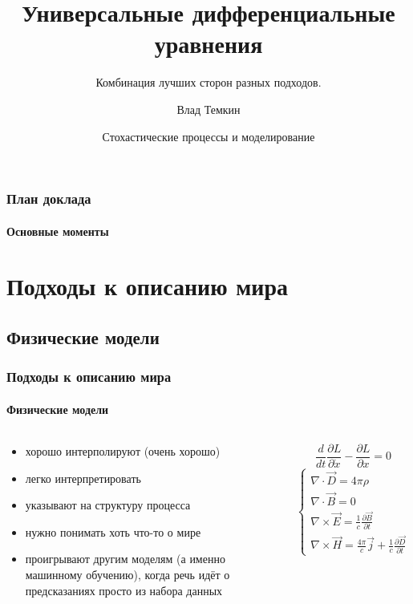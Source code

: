 \documentclass[10pt,pdf,hyperref={unicode}]{beamer}
\title[UDE]{Универсальные дифференциальные уравнения}
\subtitle{Комбинация лучших сторон разных подходов.}
\author{Влад Темкин}
\institute[HSE] %
{
	Высшая Школа Экономики\\
	Факультет Физики
}
\date[\today]
{Стохастические процессы и моделирование}
\begin{document}
	
	\begin{frame}
		\titlepage
	\end{frame} 
	
	
	\begin{frame}
		\frametitle{План доклада} 
		\framesubtitle{Основные моменты}
		\tableofcontents[pausesections]
	\end{frame}


	\section{Подходы к описанию мира}
	
		\subsection{Физические модели}
		
			\begin{frame}
				\frametitle{Подходы к описанию мира} 
				\framesubtitle{Физические модели}
					\begin{columns}
						\column{0.5\linewidth}
						\begin{center}
							\begin{itemize}
								\item хорошо интерполируют (очень хорошо)
								\item легко интерпретировать 
								\item указывают на структуру процесса
								\item нужно понимать хоть что-то о мире
								\item проигрывают другим моделям (а именно машинному обучению), когда речь идёт о предсказаниях просто из набора данных
							\end{itemize}
						\end{center}
						\column{0.5\linewidth}
							\begin{displaymath}
								\frac{d}{dt}\frac{\partial L}{\partial \dot{x}} - \frac{\partial L}{\partial x} = 0
							\end{displaymath}
							\newline
							\begin{displaymath}
								\left\{\begin{gathered}
									\nabla \cdot \vec{D} = 4\pi	\rho\\
									\nabla \cdot \vec{B} = 0 \\
									\nabla \times \vec{E} = \frac{1}{c}\frac{\partial \vec{B}}{\partial t} \\
									\nabla \times \vec{H} = \frac{4\pi}{c}\vec{j} + \frac{1}{c}\frac{\partial \vec{D}}{\partial t}
								\end{gathered}\right.
							\end{displaymath}
					\end{columns}
			\end{frame}
		
\end{document}
